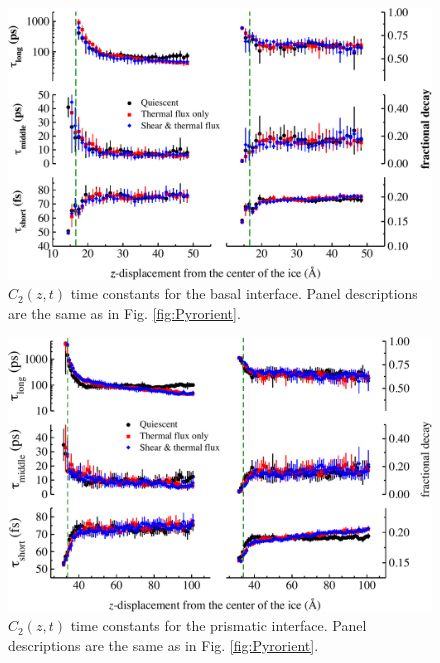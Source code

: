 \begin{figure}
\includegraphics[width=\linewidth]{Figures/Bas_lcorrz}
\caption{\label{fig:Borient} $C_2(z,t)$ time constants for the basal
  interface.  Panel descriptions are the same as in
  Fig. \ref{fig:Pyrorient}. }
\end{figure}

\begin{figure}
\includegraphics[width=\linewidth]{Figures/Pri_lcorrz}
\caption{\label{fig:Porient} $C_2(z,t)$ time constants for the prismatic
  interface.  Panel descriptions are the same as in
  Fig. \ref{fig:Pyrorient}.}
\end{figure}

